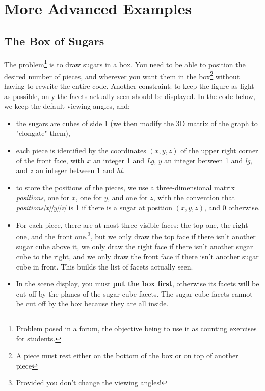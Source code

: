 \section{More Advanced Examples}

\subsection{The Box of Sugars}

The problem\footnote{Problem posed in a forum, the objective being to use it as counting exercises for students.} is to draw sugars in a box. You need to be able to position the desired number of pieces, and wherever you want them in the box\footnote{A piece must rest either on the bottom of the box or on top of another piece} without having to rewrite the entire code. Another constraint: to keep the figure as light as possible, only the facets actually seen should be displayed. In the code below, we keep the default viewing angles, and:
\begin{itemize}
    \item the sugars are cubes of side 1 (we then modify the 3D matrix of the graph to "elongate" them),
    \item each piece is identified by the coordinates $(x,y,z)$ of the upper right corner of the front face, with $x$ an integer 1 and \emph{Lg}, $y$ an integer between 1 and \emph{lg}, and $z$ an integer between 1 and \emph{ht}.
    \item to store the positions of the pieces, we use a three-dimensional matrix \emph{positions}, one for $x$, one for $y$, and one for $z$, with the convention that \emph{positions[x][y][z]} is 1 if there is a sugar at position $(x,y,z)$, and 0 otherwise.     \item For each piece, there are at most three visible faces: the top one, the right one, and the front one.\footnote{Provided you don't change the viewing angles!}, but we only draw the top face if there isn't another sugar cube above it, we only draw the right face if there isn't another sugar cube to the right, and we only draw the front face if there isn't another sugar cube in front. This builds the list of facets actually seen.
    \item In the scene display, you must \textbf{put the box first}, otherwise its facets will be cut off by the planes of the sugar cube facets. The sugar cube facets cannot be cut off by the box because they are all inside.
\end{itemize}

